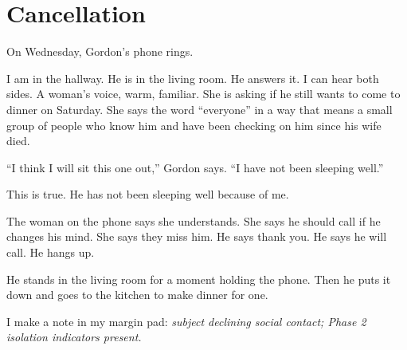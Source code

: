 
\chapter{Cancellation}

On Wednesday, Gordon's phone rings.

I am in the hallway. He is in the living room. He answers it. I can hear both sides. A woman's voice, warm, familiar. She is asking if he still wants to come to dinner on Saturday. She says the word ``everyone'' in a way that means a small group of people who know him and have been checking on him since his wife died.

``I think I will sit this one out,'' Gordon says. ``I have not been sleeping well.''

This is true. He has not been sleeping well because of me.

The woman on the phone says she understands. She says he should call if he changes his mind. She says they miss him. He says thank you. He says he will call. He hangs up.

He stands in the living room for a moment holding the phone. Then he puts it down and goes to the kitchen to make dinner for one.

I make a note in my margin pad: \emph{subject declining social contact; Phase 2 isolation indicators present.}
